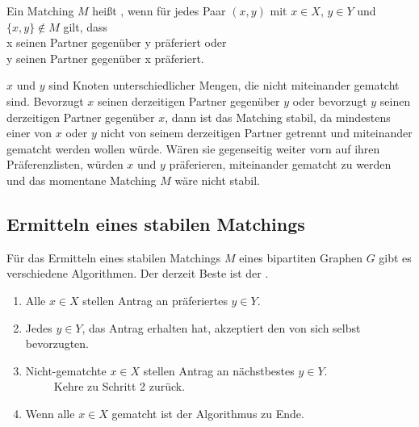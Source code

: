 \begin{df}
Ein Matching $M$ heißt , wenn für jedes Paar $(x, y)$ mit $x \in X$, $y \in Y$ und $\{x, y\} \notin M$ gilt, dass
\\ x seinen Partner gegenüber y präferiert oder 
\\ y seinen Partner gegenüber x präferiert.
\end{df}

\noindent $x$ und $y$ sind Knoten unterschiedlicher Mengen, die nicht miteinander gematcht sind. Bevorzugt $x$ seinen derzeitigen Partner gegenüber $y$ oder bevorzugt $y$ seinen derzeitigen Partner gegenüber $x$, dann ist das Matching stabil, da mindestens einer von $x$ oder $y$ nicht von seinem derzeitigen Partner getrennt und miteinander gematcht werden wollen würde. Wären sie gegenseitig weiter vorn auf ihren Präferenzlisten, würden $x$ und $y$ präferieren, miteinander gematcht zu werden und das momentane Matching $M$ wäre nicht stabil.

\subsection{Ermitteln eines stabilen Matchings}
Für das Ermitteln eines stabilen Matchings $M$ eines bipartiten Graphen $G$ gibt es verschiedene Algorithmen. Der derzeit Beste ist der .
\begin{enumerate}
\item Alle $x \in X$ stellen Antrag an präferiertes $y \in Y$.
\item Jedes $y \in Y$, das Antrag erhalten hat, akzeptiert den von sich selbst bevorzugten.
\item Nicht-gematchte $x \in X$ stellen Antrag an nächstbestes $y \in Y$.
\\ \ \ \ \ \ Kehre zu Schritt 2 zurück.
\item Wenn alle $x \in X$ gematcht ist der Algorithmus zu Ende.
\end{enumerate}

